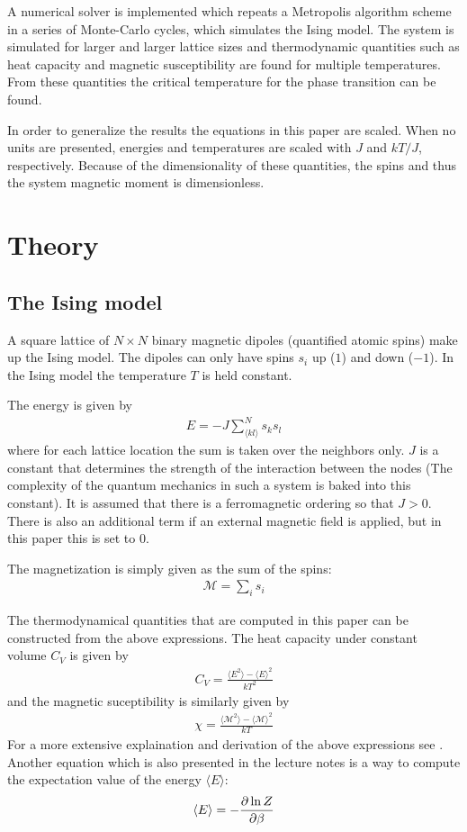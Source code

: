 \documentclass[aps,reprint]{revtex4-1}
\newcommand{\mean}[1]{\langle #1 \rangle}
\begin{document}
A numerical solver is implemented which repeats a Metropolis algorithm scheme
in a series of Monte-Carlo cycles, which simulates the Ising model.
The system is simulated for larger and larger lattice sizes and thermodynamic
quantities such as heat capacity and magnetic susceptibility are found for
multiple temperatures. From these quantities the critical temperature for the
phase transition can be found.

In order to generalize the results the equations in this paper are scaled.
When no units are presented, energies and temperatures are scaled with $J$ and
$kT/J$, respectively. Because of the dimensionality of these quantities, the spins
and thus the system magnetic moment is dimensionless.
\section{Theory} \label{sec:theory}
\subsection{The Ising model}
A square lattice of $N \times N$ binary magnetic dipoles (quantified atomic spins)
make up the Ising model. The dipoles can only have spins $s_i$ up ($1$) and down ($-1$).
In the Ising model the temperature $T$ is held constant.

The energy is given by
\begin{align}\label{eq:energy}
  E = -J \sum_{\langle kl \rangle}^{N} s_k s_l
\end{align}
where for each lattice location the sum is taken over the neighbors only. $J$ is
a constant that determines the strength of the interaction between the nodes
(The complexity of the quantum mechanics in such a system is baked into
this constant). It is assumed that there is a ferromagnetic ordering so that $J > 0$.
There is also an additional term if an external magnetic field is applied, but
in this paper this is set to $0$.

The magnetization is simply given as the sum of the spins:
\begin{align}\label{eq:magmom}
  \mathcal{M} = \sum_i s_i
\end{align}

The thermodynamical quantities that are computed in this paper can be constructed
from the above expressions. The heat capacity under constant volume $C_V$ is given
by
\begin{align}\label{eq:Cv}
  C_V = \frac{\mean{E^2} - \mean{E}^2}{kT^2}
\end{align}
and the magnetic suceptibility is similarly given by
\begin{align}\label{eq:sus}
  \chi = \frac{\mean{\mathcal{M}^2} - \mean{\mathcal{M}}^2}{kT}
\end{align}
For a more extensive explaination and derivation of the above expressions see
\cite{mortenjensen}. Another equation which is also presented in the lecture notes
is a way to compute the expectation value of the energy $\mean{E}$:
\begin{align}\label{eq:meanE}
  \mean{E} = - \pdv{\ln{Z}}{\beta}
\end{align}
\end{document}
